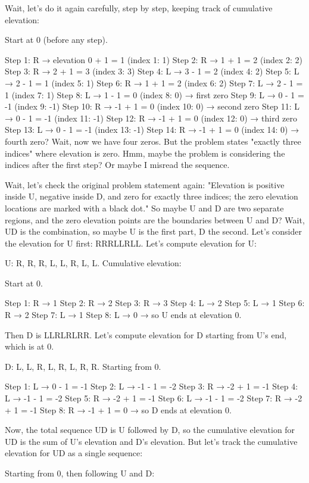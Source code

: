 Wait, let's do it again carefully, step by step, keeping track of cumulative elevation:

Start at 0 (before any step).

Step 1: R → elevation 0 + 1 = 1 (index 1: 1)
Step 2: R → 1 + 1 = 2 (index 2: 2)
Step 3: R → 2 + 1 = 3 (index 3: 3)
Step 4: L → 3 - 1 = 2 (index 4: 2)
Step 5: L → 2 - 1 = 1 (index 5: 1)
Step 6: R → 1 + 1 = 2 (index 6: 2)
Step 7: L → 2 - 1 = 1 (index 7: 1)
Step 8: L → 1 - 1 = 0 (index 8: 0) → first zero
Step 9: L → 0 - 1 = -1 (index 9: -1)
Step 10: R → -1 + 1 = 0 (index 10: 0) → second zero
Step 11: L → 0 - 1 = -1 (index 11: -1)
Step 12: R → -1 + 1 = 0 (index 12: 0) → third zero
Step 13: L → 0 - 1 = -1 (index 13: -1)
Step 14: R → -1 + 1 = 0 (index 14: 0) → fourth zero? Wait, now we have four zeros. But the problem states "exactly three indices" where elevation is zero. Hmm, maybe the problem is considering the indices after the first step? Or maybe I misread the sequence.

Wait, let's check the original problem statement again: "Elevation is positive inside U, negative inside D, and zero for exactly three indices; the zero elevation locations are marked with a black dot." So maybe U and D are two separate regions, and the zero elevation points are the boundaries between U and D? Wait, UD is the combination, so maybe U is the first part, D the second. Let's consider the elevation for U first: RRRLLRLL. Let's compute elevation for U:

U: R, R, R, L, L, R, L, L. Cumulative elevation:

Start at 0.

Step 1: R → 1
Step 2: R → 2
Step 3: R → 3
Step 4: L → 2
Step 5: L → 1
Step 6: R → 2
Step 7: L → 1
Step 8: L → 0 → so U ends at elevation 0.

Then D is LLRLRLRR. Let's compute elevation for D starting from U's end, which is at 0.

D: L, L, R, L, R, L, R, R. Starting from 0.

Step 1: L → 0 - 1 = -1
Step 2: L → -1 - 1 = -2
Step 3: R → -2 + 1 = -1
Step 4: L → -1 - 1 = -2
Step 5: R → -2 + 1 = -1
Step 6: L → -1 - 1 = -2
Step 7: R → -2 + 1 = -1
Step 8: R → -1 + 1 = 0 → so D ends at elevation 0.

Now, the total sequence UD is U followed by D, so the cumulative elevation for UD is the sum of U's elevation and D's elevation. But let's track the cumulative elevation for UD as a single sequence:

Starting from 0, then following U and D:

